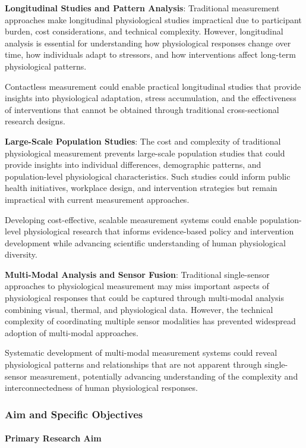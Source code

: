 \documentclass[11pt,a4paper]{report}
\begin{document}
\textbf{Longitudinal Studies and Pattern Analysis}: Traditional measurement approaches make longitudinal physiological
studies impractical due to participant burden, cost considerations, and technical complexity. However, longitudinal
analysis is essential for understanding how physiological responses change over time, how individuals adapt to
stressors, and how interventions affect long-term physiological patterns.

Contactless measurement could enable practical longitudinal studies that provide insights into physiological adaptation,
stress accumulation, and the effectiveness of interventions that cannot be obtained through traditional cross-sectional
research designs.

\textbf{Large-Scale Population Studies}: The cost and complexity of traditional physiological measurement prevents
large-scale population studies that could provide insights into individual differences, demographic patterns, and
population-level physiological characteristics. Such studies could inform public health initiatives, workplace design,
and intervention strategies but remain impractical with current measurement approaches.

Developing cost-effective, scalable measurement systems could enable population-level physiological research that
informs evidence-based policy and intervention development while advancing scientific understanding of human
physiological diversity.

\textbf{Multi-Modal Analysis and Sensor Fusion}: Traditional single-sensor approaches to physiological measurement may miss
important aspects of physiological responses that could be captured through multi-modal analysis combining visual,
thermal, and physiological data. However, the technical complexity of coordinating multiple sensor modalities has
prevented widespread adoption of multi-modal approaches.

Systematic development of multi-modal measurement systems could reveal physiological patterns and relationships that are
not apparent through single-sensor measurement, potentially advancing understanding of the complexity and
interconnectedness of human physiological responses.

\subsubsection{Aim and Specific Objectives}

\paragraph{Primary Research Aim}
\end{document}
